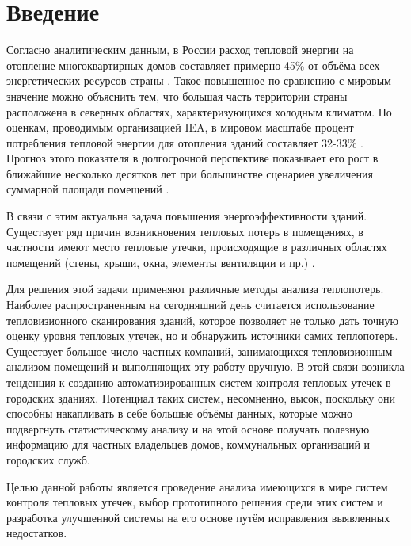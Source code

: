 {
	\titleformat{\section}[block]{\centering\normalfont\large\bfseries}{\thesection}{10pt}{}
	\section*{\centering Введение}
}

\par
	Согласно аналитическим данным, в России расход тепловой энергии на отопление многоквартирных домов составляет примерно 45\% от объёма всех энергетических ресурсов страны \cite{intro:thermo-analysis-federal}. Такое повышенное по сравнению с мировым значение можно объяснить тем, что большая часть территории страны расположена в северных областях, характеризующихся холодным климатом. По оценкам, проводимым организацией IEA, в мировом масштабе процент потребления тепловой энергии для отопления зданий составляет 32-33\% \cite{intro:heating-drivers}. Прогноз этого показателя в долгосрочной перспективе показывает его рост в ближайшие несколько десятков лет при большинстве сценариев увеличения суммарной площади помещений \cite{intro:energy-use-perspective}.

\par
	В связи с этим актуальна задача повышения энергоэффективности зданий. Существует ряд причин возникновения тепловых потерь в помещениях, в частности имеют место тепловые утечки, происходящие в различных областях помещений (стены, крыши, окна, элементы вентиляции и пр.) \cite{intro:heat-loss-sources, intro:sources-residental}.

\par
	Для решения этой задачи применяют различные методы анализа теплопотерь. Наиболее распространенным на сегодняшний день считается использование тепловизионного сканирования зданий, которое позволяет не только дать точную оценку уровня тепловых утечек, но и обнаружить источники самих теплопотерь. Существует большое число частных компаний, занимающихся тепловизионным анализом помещений и выполняющих эту работу вручную. В этой связи возникла тенденция к созданию автоматизированных систем контроля тепловых утечек в городских зданиях. Потенциал таких систем, несомненно, высок, поскольку они способны накапливать в себе большые объёмы данных, которые можно подвергнуть статистическому анализу и на этой основе получать полезную информацию для частных владельцев домов, коммунальных организаций и городских служб.

\par
	Целью данной работы является проведение анализа имеющихся в мире систем контроля тепловых утечек, выбор прототипного решения среди этих систем и разработка улучшенной системы на его основе путём исправления выявленных недостатков.
